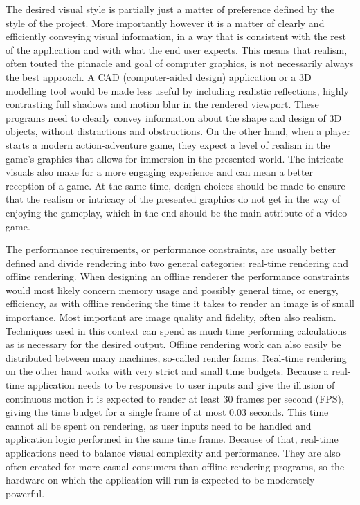 The desired visual style is partially just a matter of preference defined by the style of the project. More importantly however it is a matter of clearly and efficiently conveying visual information, in a way that is consistent with the rest of the application and with what the end user expects. This means that realism, often touted the pinnacle and goal of computer graphics, is not necessarily always the best approach. A CAD (computer-aided design) application or a 3D modelling tool would be made less useful by including realistic reflections, highly contrasting full shadows and motion blur in the rendered viewport. These programs need to clearly convey information about the shape and design of 3D objects, without distractions and obstructions. On the other hand, when a player starts a modern action-adventure game, they expect a level of realism in the game's graphics that allows for immersion in the presented world. The intricate visuals also make for a more engaging experience and can mean a better reception of a game. At the same time, design choices should be made to ensure that the realism or intricacy of the presented graphics do not get in the way of enjoying the gameplay, which in the end should be the main attribute of a video game.

The performance requirements, or performance constraints, are usually better defined and divide rendering into two general categories: real-time rendering and offline rendering. When designing an offline renderer the performance constraints would most likely concern memory usage and possibly general time, or energy, efficiency, as with offline rendering the time it takes to render an image is of small importance. Most important are image quality and fidelity, often also realism. Techniques used in this context can spend as much time performing calculations as is necessary for the desired output. Offline rendering work can also easily be distributed between many machines, so-called render farms. Real-time rendering on the other hand works with very strict and small time budgets. Because a real-time application needs to be responsive to user inputs and give the illusion of continuous motion it is expected to render at least 30 frames per second (FPS), giving the time budget for a single frame of at most 0.03 seconds. This time cannot all be spent on rendering, as user inputs need to be handled and application logic performed in the same time frame. Because of that, real-time applications need to balance visual complexity and performance. They are also often created for more casual consumers than offline rendering programs, so the hardware on which the application will run is expected to be moderately powerful.

